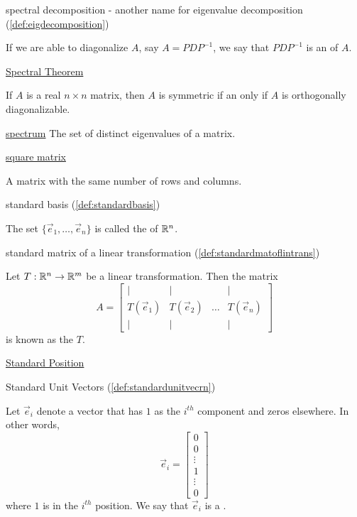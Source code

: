 \documentclass{ximera}
\begin{document}
spectral decomposition - another name for eigenvalue decomposition (\ref{def:eigdecomposition})
\begin{expandable}
    If we are able to diagonalize $A$, say $A=PDP^{-1}$, we say that $PDP^{-1}$ is an  of $A$.
\end{expandable}

\href{https://ximera.osu.edu/oerlinalg/LinearAlgebra/RTH-0035/main}{Spectral Theorem}
\begin{expandable}
    If $A$ is a real $n \times n$ matrix, then $A$ is symmetric if an only if $A$ is orthogonally diagonalizable.
\end{expandable}

\href{https://ximera.osu.edu/oerlinalg/LinearAlgebra/RTH-0035/main}{spectrum} 
The set of distinct eigenvalues of a matrix.


\href{https://ximera.osu.edu/oerlinalg/LinearAlgebra/MAT-0010/main}
{square matrix}
\begin{expandable}
    A matrix with the same number of rows and columns.
\end{expandable}

standard basis (\ref{def:standardbasis})
\begin{expandable}
    The set $\{\vec{e}_1, \ldots ,\vec{e}_n\}$ is called the  of $\mathbb{R}^n$.
\end{expandable}

standard matrix of a linear transformation (\ref{def:standardmatoflintrans})
\begin{expandable}
    Let $T:\mathbb{R}^n\rightarrow\mathbb{R}^m$ be a linear transformation.  Then the matrix
  \begin{equation*} \label{matlintrans}
 A=\begin{bmatrix}
           | & |& &|\\
		T(\vec{e}_1) & T(\vec{e}_2)&\dots &T(\vec{e}_n)\\
		|&| & &|
         \end{bmatrix}
\end{equation*}
is known as the  $T$.
\end{expandable}

\href{https://ximera.osu.edu/oerlinalg/LinearAlgebra/VEC-0010/main}{Standard Position}

Standard Unit Vectors (\ref{def:standardunitvecrn})
\begin{expandable}
  Let $\vec{e}_i$ denote a vector that has $1$ as the $i^{th}$ component and zeros elsewhere.  In other words, $$\vec{e}_i=\begin{bmatrix}
0\\
0\\
\vdots\\
1\\
\vdots\\
0
\end{bmatrix}$$ 
  where $1$ is in the $i^{th}$ position.  We say that  $\vec{e}_i$ is a .
\end{expandable}
\end{document}
